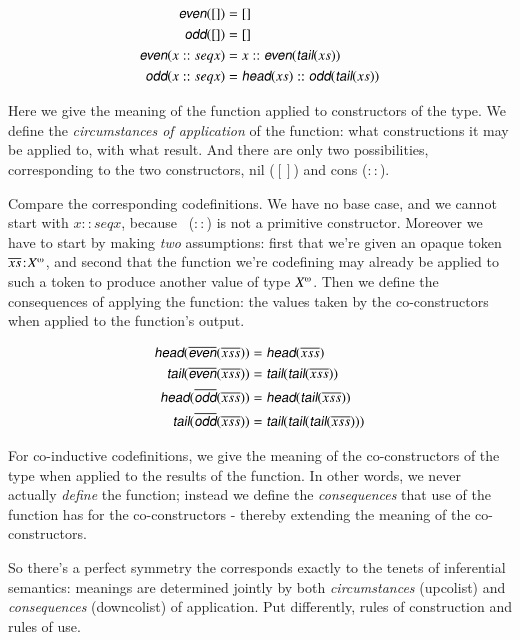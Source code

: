 \documentclass{article}
\begin{document}
\begin{align}
  \defn{even}([]) & = [] \\
  \defn{odd}([]) & = [] \\
  \defn{even}(x::seq{x}) & = x::\defn{even}(\tail(\seq{x})) \\
  \defn{odd}(x::seq{x}) & = \head(\seq{x})::\defn{odd}(\tail(\seq{x}))
\end{align}

Here we give the meaning of the function applied to constructors of
the type. We define the \textit{circumstances of application} of the
function: what constructions it may be applied to, with what result.
And there are only two possibilities, corresponding to the two
constructors, nil (\([]\)) and cons (\(::\)).

Compare the corresponding codefinitions. We have no base case, and we
cannot start with \(x::seq{x}\), because \cons\ (\(::\)) is not a
primitive constructor. Moreover we have to start by making
\textit{two} assumptions: first that we're given an opaque token
\(\tj{\coseq{x}}{\colist{X}}\), and second that the function we're
codefining may already be applied to such a token to produce another
value of type \(\colist{X}\). Then we define the consequences of
applying the function: the values taken by the co-constructors when
applied to the function's output.

\begin{align}
  \cohead(\codefn{even}(\coseq{xs})) & = \cohead(\coseq{xs}) \\
  \cotail(\codefn{even}(\coseq{xs})) & = \cotail(\cotail(\coseq{xs})) \\
  \cohead(\codefn{odd}(\coseq{xs})) & = \cohead(\cotail(\coseq{xs})) \\
  \cotail(\codefn{odd}(\coseq{xs})) & = \cotail(\cotail(\cotail(\coseq{xs})))
\end{align}

For co-inductive codefinitions, we give the meaning of the
co-constructors of the type when applied to the results of the
function. In other words, we never actually \textit{define} the
function; instead we define the \textit{consequences} that use of the
function has for the co-constructors - thereby extending the meaning
of the co-constructors.

So there's a perfect symmetry the corresponds exactly to the tenets of
inferential semantics: meanings are determined jointly by both
\textit{circumstances} (upcolist) and \textit{consequences}
(downcolist) of application. Put differently, rules of construction
and rules of use.
\end{document}
